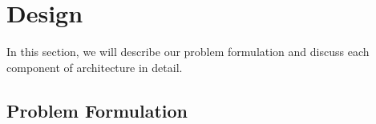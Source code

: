 \section{\Sys Design}
\label{sec:methodology}
In this section, we will describe our problem formulation and discuss each component of \Sys architecture in detail.





\subsection{Problem Formulation}



